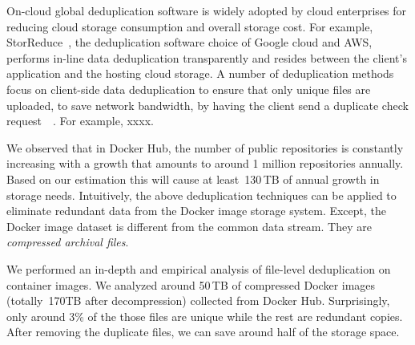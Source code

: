 On-cloud global deduplication software is widely adopted by cloud enterprises for reducing cloud storage consumption and overall storage cost. 
For example, StorReduce~\cite{storreduce_purestorage}, the deduplication software choice of Google cloud and AWS, 
performs in-line data deduplication transparently and resides between the client's application and the hosting cloud storage.
A number of deduplication methods focus on client-side data deduplication to ensure that only unique files are uploaded, 
to save network bandwidth, by having the client send a duplicate check request~\cite{xxx}~\cite{xxx}. 
For example, xxxx.

We observed that in Docker Hub, the number of public repositories is constantly increasing with a growth that amounts 
to around 1 million repositories annually. Based on our estimation this will cause at least~130\,TB of annual growth in storage needs. 
Intuitively, the above deduplication techniques can be applied to eliminate redundant data from the Docker image storage system.  
Except, the Docker image dataset is different from the common data stream. 
They are \emph{compressed archival files}.

We performed an in-depth and empirical analysis of file-level deduplication on container images. 
We analyzed around 50\,TB of compressed Docker images (totally~170TB after decompression) collected from Docker Hub. 
Surprisingly, only around 3\% of the those files are unique while the rest are redundant copies. 
After removing the duplicate files, we can save around half of the storage space.

